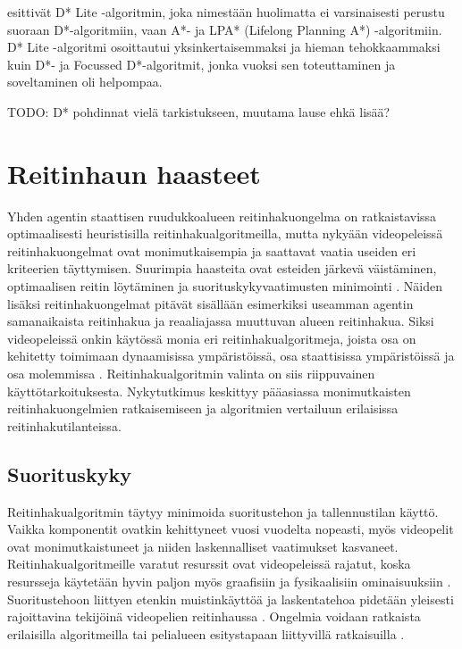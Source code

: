 \documentclass[utf8]{gradu3}
\begin{document}
\textcite{koenig2005fast} esittivät D* Lite -algoritmin, joka nimestään huolimatta ei varsinaisesti perustu suoraan D*-algoritmiin, vaan A*- ja LPA* (Lifelong Planning A*) -algoritmiin. D* Lite -algoritmi osoittautui yksinkertaisemmaksi ja hieman tehokkaammaksi kuin D*- ja Focussed D*-algoritmit, jonka vuoksi sen toteuttaminen ja soveltaminen oli helpompaa.

TODO: D* pohdinnat vielä tarkistukseen, muutama lause ehkä lisää?

\section{Reitinhaun haasteet}

Yhden agentin staattisen ruudukkoalueen reitinhakuongelma on ratkaistavissa optimaalisesti heuristisilla reitinhakualgoritmeilla, mutta nykyään videopeleissä reitinhakuongelmat ovat monimutkaisempia ja saattavat vaatia useiden eri kriteerien täyttymisen. Suurimpia haasteita ovat esteiden järkevä väistäminen, optimaalisen reitin löytäminen ja suorituskykyvaatimusten minimointi \parencite{abd2015comprehensive,cui2011based}. Näiden lisäksi reitinhakuongelmat pitävät sisällään esimerkiksi useamman agentin samanaikaista reitinhakua ja reaaliajassa muuttuvan alueen reitinhakua. Siksi videopeleissä onkin käytössä monia eri reitinhakualgoritmeja, joista osa on kehitetty toimimaan dynaamisissa ympäristöissä, osa staattisissa ympäristöissä ja osa molemmissa \parencite{lawande2022systematic}. Reitinhakualgoritmin valinta on siis riippuvainen käyttötarkoituksesta. Nykytutkimus keskittyy pääasiassa monimutkaisten reitinhakuongelmien ratkaisemiseen ja algoritmien vertailuun erilaisissa reitinhakutilanteissa.

\subsection{Suorituskyky}

Reitinhakualgoritmin täytyy minimoida suoritustehon ja tallennustilan käyttö. Vaikka komponentit ovatkin kehittyneet vuosi vuodelta nopeasti, myös videopelit ovat monimutkaistuneet ja niiden laskennalliset vaatimukset kasvaneet. Reitinhakualgoritmeille varatut resurssit ovat videopeleissä rajatut, koska resursseja käytetään hyvin paljon myös graafisiin ja fysikaalisiin ominaisuuksiin \parencite{lawande2022systematic}. Suoritustehoon liittyen etenkin muistinkäyttöä ja laskentatehoa pidetään yleisesti rajoittavina tekijöinä videopelien reitinhaussa \parencite{botea2013pathfinding}. Ongelmia voidaan ratkaista erilaisilla algoritmeilla tai pelialueen esitystapaan liittyvillä ratkaisuilla \parencite{botea2013pathfinding,cui2011based}.
\end{document}
